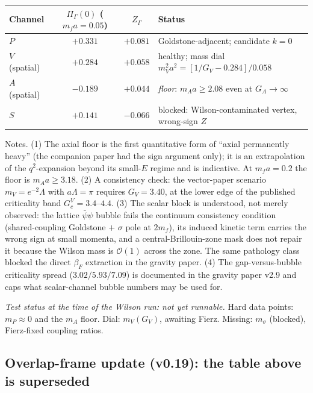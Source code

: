 \documentclass[11pt,a4paper]{article}
\begin{document}
\begin{center}
\begin{tabular}{lccl}
\toprule
Channel & $\Pi_\Gamma(0)$ ($m_f a{=}0.05$) & $Z_\Gamma$ & Status \\
\midrule
$P$ & $+0.331$ & $+0.081$ & Goldstone-adjacent; candidate $k{=}0$ \\
$V$ (spatial) & $+0.284$ & $+0.058$ & healthy; mass dial
  $m_V^2 a^2 = [1/G_V - 0.284]/0.058$ \\
$A$ (spatial) & $-0.189$ & $+0.044$ & \emph{floor}:
  $m_A a \ge 2.08$ even at $G_A \to \infty$ \\
$S$ & $+0.141$ & $-0.066$ & blocked: Wilson-contaminated vertex,
  wrong-sign $Z$ \\
\bottomrule
\end{tabular}
\end{center}

Notes.
(1) The axial floor is the first quantitative form of ``axial
permanently heavy'' (the companion paper had the sign argument
only); it is an extrapolation of the $q^2$-expansion beyond its
small-$E$ regime and is indicative.
At $m_f a = 0.2$ the floor is $m_A a \ge 3.18$.
(2) A consistency check: the vector-paper scenario
$m_V = e^{-2}\Lambda$ with $a\Lambda = \pi$ requires
$G_V = 3.40$, at the lower edge of the published criticality band
$G_c^V = 3.4$--$4.4$.
(3) The scalar block is understood, not merely observed: the
lattice $\bar\psi\psi$ bubble fails the continuum consistency
condition (shared-coupling Goldstone $+$ $\sigma$ pole at $2m_f$),
its induced kinetic term carries the wrong sign at small momenta,
and a central-Brillouin-zone mask does not repair it because the
Wilson mass is $\mathcal{O}(1)$ across the zone.
The same pathology class blocked the direct $\beta_F$ extraction
in the gravity paper.
(4) The gap-versus-bubble criticality spread
($3.02 / 5.93 / 7.09$) is documented in the gravity paper v2.9
and caps what scalar-channel bubble numbers may be used for.

\emph{Test status at the time of the Wilson run: not yet runnable.}
Hard data points: $m_P \approx 0$ and the $m_A$ floor.
Dial: $m_V(G_V)$, awaiting Fierz.
Missing: $m_\sigma$ (blocked), Fierz-fixed coupling ratios.

\subsection*{Overlap-frame update (v0.19): the table above is
superseded}
\end{document}
